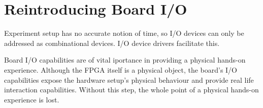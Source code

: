 \documentclass[openright]{template/uva-bachelor-thesis}
\begin{document}






















\section{Reintroducing Board I/O}
\label{sectionreintroducingio}

Experiment setup has no accurate notion of time, so I/O devices can only be addressed as combinational devices. I/O device drivers facilitate this.

Board I/O capabilities are of vital iportance in providing a physical hands-on experience. Although the FPGA itself is a physical object, the board's I/O capabilities expose the hardware setup's physical behaviour and provide real life interaction capabilities. Without this step, the whole point of a physical hands-on experience is lost.
\end{document}

